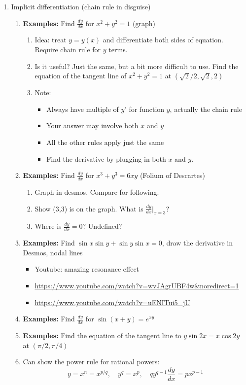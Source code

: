 \documentclass{article}
\begin{document}
\begin{enumerate}
\item Implicit differentiation (chain rule in disguise)
\begin{enumerate}
\item {\bf Examples:} Find $\frac{dy}{dx}$ for $x^2+y^2 =1$ (graph)
\begin{enumerate}
\item Idea: treat $y=y(x)$ and differentiate both sides of equation. Require chain rule for $y$ terms.
\item Is it useful? Just the same, but a bit more difficult to use. Find the equation of the tangent line of $x^2+y^2 = 1$ at $(\sqrt{2}/2,\sqrt{2},2)$
\item Note:
\begin{itemize}
\item Always have multiple of $y'$ for function $y$, actually the chain rule
\item Your answer may involve both $x$ and $y$
\item All the other rules apply just the same
\item Find the derivative by plugging in both $x$ and $y$. 
\end{itemize}
\end{enumerate}
\item {\bf Examples:} Find $\frac{dy}{dx}$ for $x^3+y^3 =6xy$ (Folium of Descartes)
\begin{enumerate}
\item Graph in desmos. Compare for following.
\item Show (3,3) is on the graph. What is $\frac{dy}{dx}|_{x=3}$?
\item Where is $\frac{dy}{dx}=0$? Undefined?
\end{enumerate}
\item {\bf Examples:} Find $\sin x\sin y+\sin y \sin x = 0$, draw the derivative in Desmos, nodal lines
\begin{itemize}
\item  Youtube: amazing resonance effect 
\item \url{https://www.youtube.com/watch?v=wvJAgrUBF4w&noredirect=1}
\item \url{https://www.youtube.com/watch?v=uENITui5_jU}
\end{itemize}
\item {\bf Examples:} Find $\frac{dy}{dx}$ for $\sin(x+y) = e^{xy}$
\item {\bf Examples:} Find the equation of the tangent line to $y\sin 2x = x\cos 2y$ at $(\pi/2, \pi/4)$
\item Can show the power rule for rational powers:
$$ y = x^n = x^{p/q}, \quad y^q = x^p, \quad qy^{q-1} \frac{dy}{dx} = px^{p-1}$$
\end{enumerate}


\end{enumerate}
\end{document}
